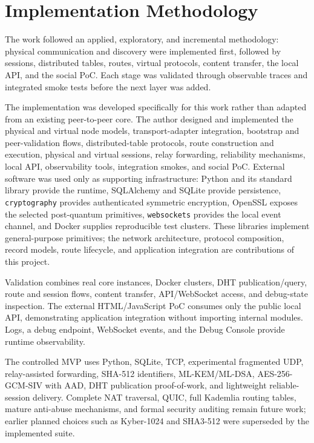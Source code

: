 \documentclass[
  12pt,
  oneside,
  a4paper,
  chapter=TITLE,
  section=TITLE,
  english,
  brazil
]{abntex2}
\begin{document}
\section{Implementation Methodology}
\label{sec:implementation-methodology}

The work followed an applied, exploratory, and incremental methodology: physical communication and discovery were implemented first, followed by sessions, distributed tables, routes, virtual protocols, content transfer, the local API, and the social PoC. Each stage was validated through observable traces and integrated smoke tests before the next layer was added.

The implementation was developed specifically for this work rather than adapted from an existing peer-to-peer core. The author designed and implemented the physical and virtual node models, transport-adapter integration, bootstrap and peer-validation flows, distributed-table protocols, route construction and execution, physical and virtual sessions, relay forwarding, reliability mechanisms, local API, observability tools, integration smokes, and social PoC. External software was used only as supporting infrastructure: Python and its standard library provide the runtime, SQLAlchemy and SQLite provide persistence, \texttt{cryptography} provides authenticated symmetric encryption, OpenSSL exposes the selected post-quantum primitives, \texttt{websockets} provides the local event channel, and Docker supplies reproducible test clusters. These libraries implement general-purpose primitives; the network architecture, protocol composition, record models, route lifecycle, and application integration are contributions of this project.

Validation combines real core instances, Docker clusters, DHT publication/query, route and session flows, content transfer, API/WebSocket access, and debug-state inspection. The external HTML/JavaScript PoC consumes only the public local API, demonstrating application integration without importing internal modules. Logs, a debug endpoint, WebSocket events, and the Debug Console provide runtime observability.

The controlled MVP uses Python, SQLite, TCP, experimental fragmented UDP, relay-assisted forwarding, SHA-512 identifiers, ML-KEM/ML-DSA, AES-256-GCM-SIV with AAD, DHT publication proof-of-work, and lightweight reliable-session delivery. Complete NAT traversal, QUIC, full Kademlia routing tables, mature anti-abuse mechanisms, and formal security auditing remain future work; earlier planned choices such as Kyber-1024 and SHA3-512 were superseded by the implemented suite.
\end{document}
